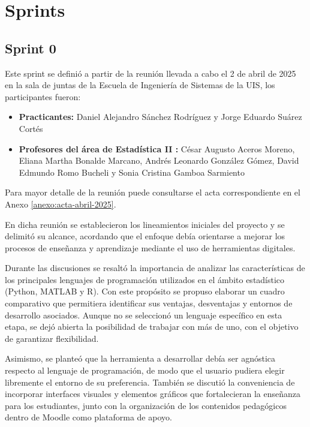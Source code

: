 \documentclass[letter,oneside,12pt,spanish]{report}
\begin{document}
\section{Sprints}
\subsection{Sprint 0}

Este sprint se definió a partir de la reunión llevada a cabo el 2 de abril de 2025 en la sala de juntas de la Escuela de Ingeniería de Sistemas de la UIS, los participantes fueron:

\begin{itemize}
	\item \textbf{Practicantes:} Daniel Alejandro Sánchez Rodríguez y Jorge Eduardo Suárez Cortés
	
	\item \textbf{Profesores del área de Estadística II :} César Augusto Aceros Moreno, Eliana Martha Bonalde Marcano, Andrés Leonardo González Gómez, David Edmundo Romo Bucheli y Sonia Cristina Gamboa Sarmiento
\end{itemize}

\noindent Para mayor detalle de la reunión puede consultarse el acta correspondiente en el Anexo \ref{anexo:acta-abril-2025}.

En dicha reunión se establecieron los lineamientos iniciales del proyecto y se delimitó su alcance, acordando que el enfoque debía orientarse a mejorar los procesos de enseñanza y aprendizaje mediante el uso de herramientas digitales.  

Durante las discusiones se resaltó la importancia de analizar las características de los principales lenguajes de programación utilizados en el ámbito estadístico (Python, MATLAB y R). Con este propósito se propuso elaborar un cuadro comparativo que permitiera identificar sus ventajas, desventajas y entornos de desarrollo asociados. Aunque no se seleccionó un lenguaje específico en esta etapa, se dejó abierta la posibilidad de trabajar con más de uno, con el objetivo de garantizar flexibilidad.  

Asimismo, se planteó que la herramienta a desarrollar debía ser agnóstica respecto al lenguaje de programación, de modo que el usuario pudiera elegir libremente el entorno de su preferencia. También se discutió la conveniencia de incorporar interfaces visuales y elementos gráficos que fortalecieran la enseñanza para los estudiantes, junto con la organización de los contenidos pedagógicos dentro de Moodle como plataforma de apoyo.  
\end{document}
